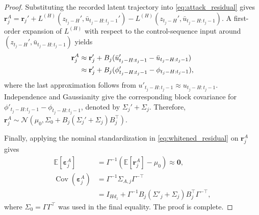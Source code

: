 \documentclass[letterpaper, 10 pt, conference]{ieeeconf}
\newcommand{\EditNA}[1]{{\color{purple} #1}}
\newcommand{\EditYW}[1]{{\color{red} #1}}
\theoremstyle{plain}
\begin{document}
\begin{proof}
    Substituting the recorded latent trajectory into \eqref{eq:attack_residual} gives $\mathbf{r}_j^A = \mathbf{r}_j' + L^{(H)}(z_{t_j-H}',\bar{u}_{t_j-H:t_j-1}') -L^{(H)}(z_{t_j-H}',\bar{u}_{t_j-H:t_j-1}).$ A first-order expansion of $L^{(H)}$ with respect to the control-sequence input around $(z_{t_j-H}',\bar{u}_{t_j-H:t_j-1})$ yields
    \begin{align*}
        \mathbf{r}_j^A &\approx \mathbf{r}_j' + B_j(\bar{u}_{t_j-H:t_j-1}'-\bar{u}_{t_j-H:t_j-1}) \notag\\
        &\approx \mathbf{r}_j' + B_j(\phi'_{t_j-H:t_j-1}-\phi_{t_j-H:t_j-1}),
    \end{align*}
    where the last approximation follows from $u'_{t_j-H:t_j-1}\approx u_{t_j-H:t_j-1}$. Independence and Gaussianity give the corresponding block covariance for $\phi'_{t_j-H:t_j-1}-\phi_{t_j-H:t_j-1}$, denoted by $\Sigma_j'+\Sigma_j$. Therefore, $\mathbf{r}_j^A \sim \mathcal{N}\left(\mu_0, \Sigma_0+B_j(\Sigma_j'+\Sigma_j)B_j^\top\right)$.

    Finally, applying the nominal standardization in
    \eqref{eq:whitened_residual} on $\mathbf{r}_j^A $ gives
    \begin{align*}
    \mathbb{E}[\pmb{\varepsilon}_j^A] &= \Gamma^{-1}\left(\mathbb{E}[\mathbf{r}_j^A] - \mu_0\right) \approx\mathbf{0},\\
    \operatorname{Cov}(\pmb{\varepsilon}_j^A)&=\Gamma^{-1}\Sigma_{A,j}\Gamma^{-\top}\\
    &= I_{Hd_z} +\Gamma^{-1} B_j (\Sigma'_j+\Sigma_j) B_j^\top\Gamma^{-\top},
    \end{align*}
    where $\Sigma_0=\Gamma\Gamma^\top$ was used in the final equality. The proof is complete.
\end{proof}






\end{document}
